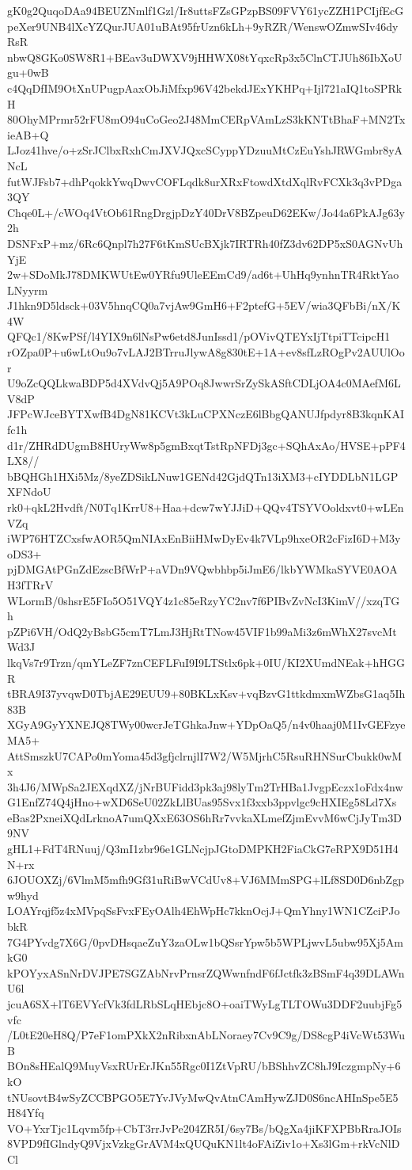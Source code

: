 gK0g2QuqoDAa94BEUZNmlf1Gzl/Ir8uttsFZsGPzpBS09FVY61ycZZH1PCIjfEcG
peXer9UNB4lXcYZQurJUA01uBAt95frUzn6kLh+9yRZR/WenswOZmwSIv46dyRsR
nbwQ8GKo0SW8R1+BEav3uDWXV9jHHWX08tYqxcRp3x5ClnCTJUh86IbXoUgu+0wB
c4QqDfIM9OtXnUPugpAaxObJiMfxp96V42bekdJExYKHPq+Ijl721aIQ1toSPRkH
80OhyMPrmr52rFU8mO94uCoGeo2J48MmCERpVAmLzS3kKNTtBhaF+MN2TxieAB+Q
LJoz41hve/o+zSrJClbxRxhCmJXVJQxcSCyppYDzuuMtCzEuYshJRWGmbr8yANcL
futWJFsb7+dhPqokkYwqDwvCOFLqdk8urXRxFtowdXtdXqlRvFCXk3q3vPDga3QY
Chqe0L+/cWOq4VtOb61RngDrgjpDzY40DrV8BZpeuD62EKw/Jo44a6PkAJg63y2h
DSNFxP+mz/6Rc6Qnpl7h27F6tKmSUcBXjk7IRTRh40fZ3dv62DP5xS0AGNvUhYjE
2w+SDoMkJ78DMKWUtEw0YRfu9UleEEmCd9/ad6t+UhHq9ynhnTR4RktYaoLNyyrm
J1hkn9D5ldsck+03V5hnqCQ0a7vjAw9GmH6+F2ptefG+5EV/wia3QFbBi/nX/K4W
QFQc1/8KwPSf/l4YIX9n6lNsPw6etd8JunIssd1/pOVivQTEYxIjTtpiTTcipcH1
rOZpa0P+u6wLtOu9o7vLAJ2BTrruJlywA8g830tE+1A+ev8sfLzROgPv2AUUlOor
U9oZcQQLkwaBDP5d4XVdvQj5A9POq8JwwrSrZySkASftCDLjOA4c0MAefM6LV8dP
JFPcWJceBYTXwfB4DgN81KCVt3kLuCPXNczE6lBbgQANUJfpdyr8B3kqnKAIfc1h
d1r/ZHRdDUgmB8HUryWw8p5gmBxqtTstRpNFDj3gc+SQhAxAo/HVSE+pPF4LX8//
bBQHGh1HXi5Mz/8yeZDSikLNuw1GENd42GjdQTn13iXM3+cIYDDLbN1LGPXFNdoU
rk0+qkL2Hvdft/N0Tq1KrrU8+Haa+dcw7wYJJiD+QQv4TSYVOoldxvt0+wLEnVZq
iWP76HTZCxsfwAOR5QmNIAxEnBiiHMwDyEv4k7VLp9hxeOR2cFizI6D+M3yoDS3+
pjDMGAtPGnZdEzscBfWrP+aVDn9VQwbhbp5iJmE6/lkbYWMkaSYVE0AOAH3fTRrV
WLormB/0shsrE5FIo5O51VQY4z1c85eRzyYC2nv7f6PIBvZvNcI3KimV//xzqTGh
pZPi6VH/OdQ2yBsbG5cmT7LmJ3HjRtTNow45VIF1b99aMi3z6mWhX27svcMtWd3J
lkqVs7r9Trzn/qmYLeZF7znCEFLFuI9I9LTStlx6pk+0IU/KI2XUmdNEak+hHGGR
tBRA9I37yvqwD0TbjAE29EUU9+80BKLxKsv+vqBzvG1ttkdmxmWZbsG1aq5Ih83B
XGyA9GyYXNEJQ8TWy00wcrJeTGhkaJnw+YDpOaQ5/n4v0haaj0M1IvGEFzyeMA5+
AttSmszkU7CAPo0mYoma45d3gfjclrnjlI7W2/W5MjrhC5RsuRHNSurCbukk0wMx
3h4J6/MWpSa2JEXqdXZ/jNrBUFidd3pk3aj98lyTm2TrHBa1JvgpEczx1oFdx4nw
G1EnfZ74Q4jHno+wXD6SeU02ZkLlBUas95Svx1f3xxb3ppvlgc9cHXIEg58Ld7Xs
eBas2PxneiXQdLrknoA7umQXxE63OS6hRr7vvkaXLmefZjmEvvM6wCjJyTm3D9NV
gHL1+FdT4RNuuj/Q3mI1zbr96e1GLNcjpJGtoDMPKH2FiaCkG7eRPX9D51H4N+rx
6JOUOXZj/6VlmM5mfh9Gf31uRiBwVCdUv8+VJ6MMmSPG+lLf8SD0D6nbZgpw9hyd
LOAYrqjf5z4xMVpqSsFvxFEyOAlh4EhWpHc7kknOcjJ+QmYhny1WN1CZciPJobkR
7G4PYvdg7X6G/0pvDHsqaeZuY3zaOLw1bQSsrYpw5b5WPLjwvL5ubw95Xj5AmkG0
kPOYyxASnNrDVJPE7SGZAbNrvPrnsrZQWwnfndF6fJctfk3zBSmF4q39DLAWnU6l
jcuA6SX+lT6EVYcfVk3fdLRbSLqHEbjc8O+oaiTWyLgTLTOWu3DDF2uubjFg5vfc
/L0tE20eH8Q/P7eF1omPXkX2nRibxnAbLNoraey7Cv9C9g/DS8cgP4iVcWt53WuB
BOn8sHEalQ9MuyVsxRUrErJKn55Rgc0I1ZtVpRU/bBShhvZC8hJ9IczgmpNy+6kO
tNUsovtB4wSyZCCBPGO5E7YvJVyMwQvAtnCAmHywZJD0S6ncAHInSpe5E5H84Yfq
VO+YxrTjc1Lqvm5fp+CbT3rrJvPe204ZR5I/6sy7Bs/bQgXa4jiKFXPBbRraJOIs
8VPD9fIGlndyQ9VjxVzkgGrAVM4xQUQuKN1lt4oFAiZiv1o+Xs3lGm+rkVcNlDCl
